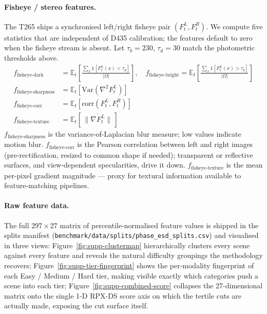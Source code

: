 \paragraph{Fisheye / stereo features.}
The T265 ships a synchronised left/right fisheye pair $(F^L_t, F^R_t)$. We compute five statistics that are independent of D435 calibration; the features default to zero when the fisheye stream is absent. Let $\tau_b = 230$, $\tau_d = 30$ match the photometric thresholds above.
\begin{align}
f_{\text{fisheye-dark}}      &= \mathbb{E}_t\!\left[\frac{\sum_x \mathbb{1}[F^L_t(x) < \tau_d]}{|\Omega|}\right], \quad
f_{\text{fisheye-bright}}    = \mathbb{E}_t\!\left[\frac{\sum_x \mathbb{1}[F^L_t(x) > \tau_b]}{|\Omega|}\right] \\
f_{\text{fisheye-sharpness}} &= \mathbb{E}_t\!\left[\text{Var}(\nabla^2 F^L_t)\right] \\
f_{\text{fisheye-corr}}      &= \mathbb{E}_t\!\left[\text{corr}(F^L_t, F^R_t)\right] \\
f_{\text{fisheye-texture}}   &= \mathbb{E}_t\!\left[\,\overline{\|\nabla F^L_t\|}\,\right]
\end{align}
$f_{\text{fisheye-sharpness}}$ is the variance-of-Laplacian blur measure; low values indicate motion blur. $f_{\text{fisheye-corr}}$ is the Pearson correlation between left and right images (pre-rectification, resized to common shape if needed); transparent or reflective surfaces, and view-dependent specularities, drive it down. $f_{\text{fisheye-texture}}$ is the mean per-pixel gradient magnitude — proxy for textural information available to feature-matching pipelines.

\paragraph{Raw feature data.}
The full $297 \times 27$ matrix of percentile-normalised feature values is shipped in the splits manifest (\texttt{benchmark/data/splits/phase\_esd\_splits.csv}) and visualised in three views: Figure~\ref{fig:supp-clustermap} hierarchically clusters every scene against every feature and reveals the natural difficulty groupings the methodology recovers; Figure~\ref{fig:supp-tier-fingerprint} shows the per-modality fingerprint of each Easy / Medium / Hard tier, making visible exactly which categories push a scene into each tier; Figure~\ref{fig:supp-combined-score} collapses the 27-dimensional matrix onto the single 1-D RPX-DS score axis on which the tertile cuts are actually made, exposing the cut surface itself.

